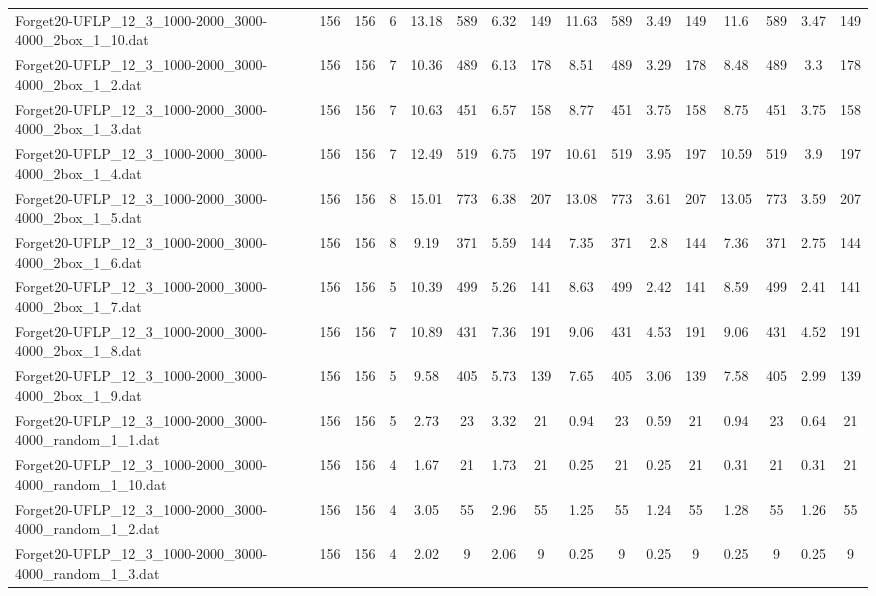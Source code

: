 \begin{sidewaystable}[!ht]
{\begin{tabular}{lccccccccccccccc}
Forget20-UFLP\_12\_3\_1000-2000\_3000-4000\_2box\_1\_10.dat & 156 & 156 & 6 & 13.18 & 589 & 6.32 & 149 & 11.63 & 589 & 3.49 & 149 & 11.6 & 589 & 3.47 & 149 \\
Forget20-UFLP\_12\_3\_1000-2000\_3000-4000\_2box\_1\_2.dat & 156 & 156 & 7 & 10.36 & 489 & 6.13 & 178 & 8.51 & 489 & 3.29 & 178 & 8.48 & 489 & 3.3 & 178 \\
Forget20-UFLP\_12\_3\_1000-2000\_3000-4000\_2box\_1\_3.dat & 156 & 156 & 7 & 10.63 & 451 & 6.57 & 158 & 8.77 & 451 & 3.75 & 158 & 8.75 & 451 & 3.75 & 158 \\
Forget20-UFLP\_12\_3\_1000-2000\_3000-4000\_2box\_1\_4.dat & 156 & 156 & 7 & 12.49 & 519 & 6.75 & 197 & 10.61 & 519 & 3.95 & 197 & 10.59 & 519 &  \textcolor{blue2}{3.9} & 197 \\
Forget20-UFLP\_12\_3\_1000-2000\_3000-4000\_2box\_1\_5.dat & 156 & 156 & 8 & 15.01 & 773 & 6.38 & 207 & 13.08 & 773 & 3.61 & 207 & 13.05 & 773 & 3.59 & 207 \\
Forget20-UFLP\_12\_3\_1000-2000\_3000-4000\_2box\_1\_6.dat & 156 & 156 & 8 & 9.19 & 371 & 5.59 & 144 & 7.35 & 371 & 2.8 & 144 & 7.36 & 371 &  \textcolor{blue2}{2.75} & 144 \\
Forget20-UFLP\_12\_3\_1000-2000\_3000-4000\_2box\_1\_7.dat & 156 & 156 & 5 & 10.39 & 499 & 5.26 & 141 & 8.63 & 499 & 2.42 & 141 & 8.59 & 499 & 2.41 & 141 \\
Forget20-UFLP\_12\_3\_1000-2000\_3000-4000\_2box\_1\_8.dat & 156 & 156 & 7 & 10.89 & 431 & 7.36 & 191 & 9.06 & 431 & 4.53 & 191 & 9.06 & 431 & 4.52 & 191 \\
Forget20-UFLP\_12\_3\_1000-2000\_3000-4000\_2box\_1\_9.dat & 156 & 156 & 5 & 9.58 & 405 & 5.73 & 139 & 7.65 & 405 & 3.06 & 139 & 7.58 & 405 &  \textcolor{blue2}{2.99} & 139 \\
Forget20-UFLP\_12\_3\_1000-2000\_3000-4000\_random\_1\_1.dat & 156 & 156 & 5 & 2.73 & 23 & 3.32 & 21 & 0.94 & 23 &  \textcolor{blue2}{0.59} & 21 & 0.94 & 23 & 0.64 & 21 \\
Forget20-UFLP\_12\_3\_1000-2000\_3000-4000\_random\_1\_10.dat & 156 & 156 & 4 & 1.67 & 21 & 1.73 & 21 &  \textcolor{blue2}{0.25} & 21 &  \textcolor{blue2}{0.25} & 21 & 0.31 & 21 & 0.31 & 21 \\
Forget20-UFLP\_12\_3\_1000-2000\_3000-4000\_random\_1\_2.dat & 156 & 156 & 4 & 3.05 & 55 & 2.96 & 55 & 1.25 & 55 & 1.24 & 55 & 1.28 & 55 & 1.26 & 55 \\
Forget20-UFLP\_12\_3\_1000-2000\_3000-4000\_random\_1\_3.dat & 156 & 156 & 4 & 2.02 & 9 & 2.06 & 9 &  \textcolor{blue2}{0.25} & 9 &  \textcolor{blue2}{0.25} & 9 &  \textcolor{blue2}{0.25} & 9 &  \textcolor{blue2}{0.25} & 9 \\

\end{tabular}}
\end{sidewaystable}
